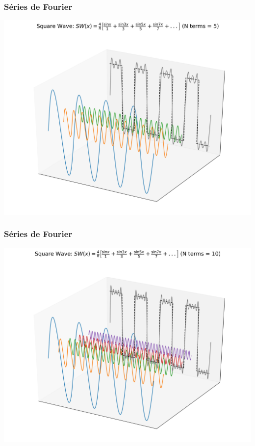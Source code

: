\documentclass{beamer}
\begin{document}
\begin{frame}
\frametitle{Séries de Fourier}
\begin{center}
\includegraphics[scale=0.4]{Figuras/sqw5.jpg}
\end{center}
\end{frame}
\begin{frame}
\frametitle{Séries de Fourier}
\begin{center}
\includegraphics[scale=0.4]{Figuras/sqw10.jpg}
\end{center}
\end{frame}
\end{document}
